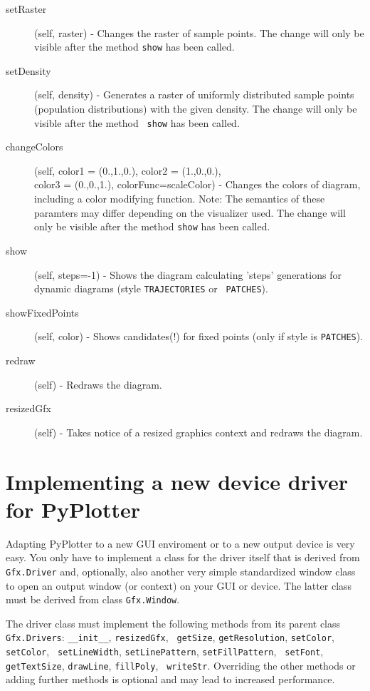\documentclass[12pt,a4paper,USenglish]{article}
\begin{document}
\begin{description}
\item[setRaster](self, raster) - Changes the raster of sample points.
  The change will only be visible after the method {\tt show} has been
  called.

\item[setDensity](self, density) - Generates a raster of uniformly
  distributed sample points (population distributions) with the given
  density.  The change will only be visible after the method {\tt
    show} has been called.

\item[changeColors](self, color1 = (0.,1.,0.), color2 = (1.,0.,0.),\\
  color3 = (0.,0.,1.), colorFunc=scaleColor) - Changes the colors of
  diagram, including a color modifying function. Note: The semantics
  of these paramters may differ depending on the visualizer used.  The
  change will only be visible after the method {\tt show} has been
  called.

\item[show](self, steps=-1) - Shows the diagram calculating 'steps'
  generations for dynamic diagrams (style {\tt TRAJECTORIES} or {\tt
    PATCHES}).

\item[showFixedPoints](self, color) - Shows candidates(!) for fixed
  points (only if style is {\tt PATCHES}).
        
\item[redraw](self) - Redraws the diagram.

\item[resizedGfx](self) - Takes notice of a resized graphics context
  and redraws the diagram.

\end{description}

\section{Implementing a new device driver for PyPlotter} 

Adapting {\sf PyPlotter} to a new GUI enviroment or to a new output
device is very easy. You only have to implement a class for the driver itself
that is derived from {\tt Gfx.Driver} and, optionally, also 
another very simple
standardized window class to open an output window (or context) on your 
GUI or device. The latter class
must be derived from class {\tt Gfx.Window}.

The driver class must implement the following methods from its parent
class {\tt Gfx.Drivers}: {\tt \_\_init\_\_}, {\tt resizedGfx}, {\tt
getSize}, {\tt getResolution}, {\tt setColor}, {\tt setColor}, {\tt
setLineWidth}, {\tt setLinePattern}, {\tt setFillPattern}, {\tt
setFont}, {\tt getTextSize}, {\tt drawLine}, {\tt fillPoly}, {\tt
writeStr}. Overriding the other methods or adding further methods is
optional and may lead to increased performance.
\end{document}
